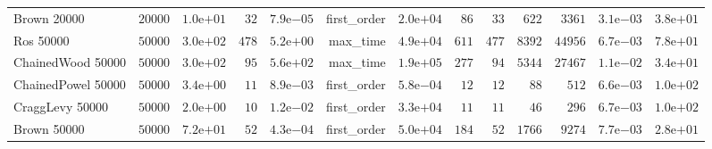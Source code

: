 \begin{longtable}[c]{lrrrrrrrrrrrr}
Brown 20000 & \(20000\) & \( 1.0\)e\(+01\) & \(   32\) & \( 7.9\)e\(-05\) & first\_order & \( 2.0\)e\(+04\) & \(   86\) & \(   33\) & \(  622\) & \( 3361\) & \( 3.1\)e\(-03\) & \( 3.8\)e\(+01\) \\
Ros 50000 & \(50000\) & \( 3.0\)e\(+02\) & \(  478\) & \( 5.2\)e\(+00\) & max\_time & \( 4.9\)e\(+04\) & \(  611\) & \(  477\) & \( 8392\) & \(44956\) & \( 6.7\)e\(-03\) & \( 7.8\)e\(+01\) \\
ChainedWood 50000 & \(50000\) & \( 3.0\)e\(+02\) & \(   95\) & \( 5.6\)e\(+02\) & max\_time & \( 1.9\)e\(+05\) & \(  277\) & \(   94\) & \( 5344\) & \(27467\) & \( 1.1\)e\(-02\) & \( 3.4\)e\(+01\) \\
ChainedPowel 50000 & \(50000\) & \( 3.4\)e\(+00\) & \(   11\) & \( 8.9\)e\(-03\) & first\_order & \( 5.8\)e\(-04\) & \(   12\) & \(   12\) & \(   88\) & \(  512\) & \( 6.6\)e\(-03\) & \( 1.0\)e\(+02\) \\
CraggLevy 50000 & \(50000\) & \( 2.0\)e\(+00\) & \(   10\) & \( 1.2\)e\(-02\) & first\_order & \( 3.3\)e\(+04\) & \(   11\) & \(   11\) & \(   46\) & \(  296\) & \( 6.7\)e\(-03\) & \( 1.0\)e\(+02\) \\
Brown 50000 & \(50000\) & \( 7.2\)e\(+01\) & \(   52\) & \( 4.3\)e\(-04\) & first\_order & \( 5.0\)e\(+04\) & \(  184\) & \(   52\) & \( 1766\) & \( 9274\) & \( 7.7\)e\(-03\) & \( 2.8\)e\(+01\) \\
\hline 
\end{longtable}



